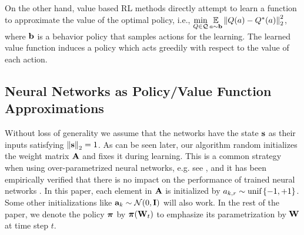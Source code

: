 On the other hand, value based RL methods directly attempt to learn a function to approximate the value of the optimal policy, i.e., $\min\limits_{Q \in {\mathcal{Q}}}{ \operatorname*{{\mathbb{E}}}\limits_{a \sim {\mathbf{b}}}{ \left\| Q(a) - Q^*(a) \right\|_2^2 }}$, where ${\mathbf{b}}$ is a behavior policy that samples actions for the learning. The learned value function induces a policy which acts greedily with respect to the value of each action.

\subsection{Neural Networks as Policy/Value Function Approximations}
\label{subsec:nn_value_policy}
 



Without loss of generality we assume that the networks have the state ${\mathbf{s}}$ as their inputs satisfying $\left\| {\mathbf{s}} \right\|_2 = 1$.
As can be seen later, our algorithm random initializes the weight matrix ${\mathbf{A}}$ and fixes it during learning. 
This is a common strategy when using over-parametrized neural networks, e.g. see \citep{li2018learning,du2018gradientA,du2018gradientB,allen2018convergenceA,allen2018convergenceB}, and it has been empirically verified that there is no impact on the performance of trained neural networks \citep{hoffer2018fix}.
In this paper, each element in ${\mathbf{A}}$ is initialized by $a_{k,r} \sim {\text{unif}}\left\{-1, +1\right\}$. Some other initializations like ${\mathbf{a}}_k \sim {\mathcal{N}}(0, {\mathbf{I}})$ will also work. In the rest of the paper, we denote the policy ${\boldsymbol{\pi}}$ by ${\boldsymbol{\pi}}({\mathbf{W}}_t)$ to emphasize its parametrization by ${\mathbf{W}}$ at time step $t$. 

